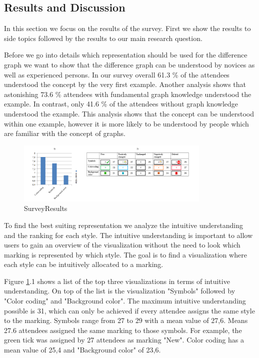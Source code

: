 \documentclass{llncs}
\begin{document}
\subsection{Results and Discussion} %
\label{sec:Results}
In this section we focus on the results of the survey. First we show the results to side topics followed by the results to our main research question.

Before we go into details which representation should be used for the difference graph we want to show that the difference graph can be understood by novices as well as experienced persons. In our survey overall 61.3 \% of the attendees understood the concept by the very first example. Another analysis shows that astonishing 73.6 \% attendees with fundamental graph knowledge understood the example. In contrast, only 41.6 \% of the attendees without graph knowledge understood the example. This analysis shows that the concept can be understood within one example, however it is more likely to be understood by people which are familiar with the concept of graphs.

\begin{figure}
	\centering
	\includegraphics[width=350px]{Images/Results.PNG}
	\caption{SurveyResults}
	\label{fig:SurveyResults}
\end{figure}

To find the best suiting representation we analyze the intuitive understanding and the ranking for each style. The intuitive understanding is important to allow users to gain an overview of the visualization without the need to look which marking is represented by which style. The goal is to find a visualization where each style can be intuitively allocated to a marking.

Figure \ref{fig:SurveyResults}.1 shows a list of the top three visualizations in terms of intuitive understanding. On top of the list is the visualization "Symbols" followed by "Color coding" and "Background color". The maximum intuitive understanding possible is 31, which can only be achieved if every attendee assigns the same style to the marking. Symbols range from 27 to 29 with a mean value of 27,6. Means 27.6 attendees assigned the same marking to those symbols. For example, the green tick was assigned by 27 attendees as marking "New". Color coding has a mean value of 25,4 and "Background color" of 23,6.
\end{document}
